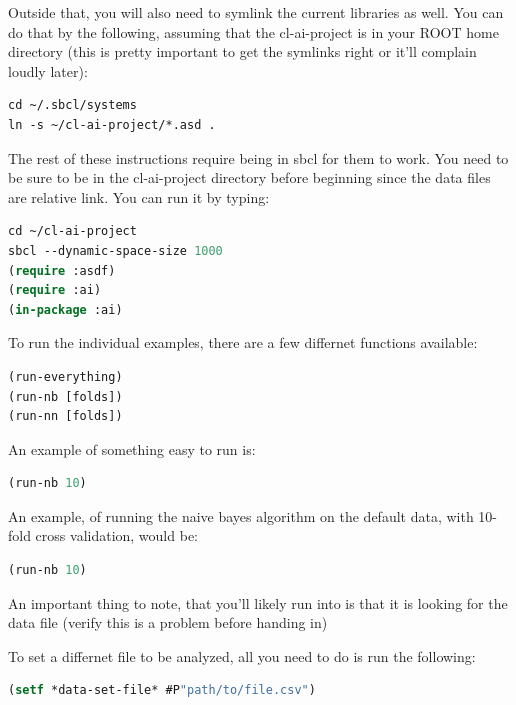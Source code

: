 \documentclass{article}
\begin{document}
Outside that, you will also need to symlink the current libraries as well.  You can do that by the following, assuming that the cl-ai-project is in your ROOT home directory (this is pretty important to get the symlinks right or it'll complain loudly later):
\begin{lstlisting}[frame=single]
cd ~/.sbcl/systems
ln -s ~/cl-ai-project/*.asd .
\end{lstlisting}
The rest of these instructions require being in sbcl for them to work.  You need to be sure to be in the cl-ai-project directory before beginning since the data files are relative link.  You can run it by typing:
\begin{lstlisting}[frame=single,language=lisp]
cd ~/cl-ai-project
sbcl --dynamic-space-size 1000
(require :asdf)
(require :ai)
(in-package :ai)
\end{lstlisting}

To run the individual examples, there are a few differnet functions available:
\begin{lstlisting}[frame=single,language=lisp]
(run-everything)
(run-nb [folds])
(run-nn [folds])
\end{lstlisting}

An example of something easy to run is:
\begin{lstlisting}[frame=single,language=lisp]
(run-nb 10)
\end{lstlisting}
An example, of running the naive bayes algorithm on the default data, with 10-fold cross validation, would be:
\begin{lstlisting}[frame=single,language=lisp]
(run-nb 10)
\end{lstlisting}

An important thing to note, that you'll likely run into is that it is looking for the data file (verify this is a problem before handing in)

To set a differnet file to be analyzed, all you need to do is run the following:
\begin{lstlisting}[frame=single,language=lisp]
(setf *data-set-file* #P"path/to/file.csv")
\end{lstlisting}
\end{document}
